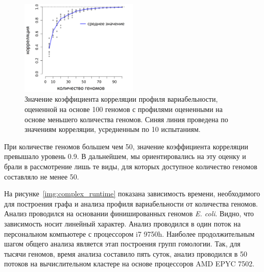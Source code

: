 \begin{figure}[!ht] 
  \center
    \includegraphics[width=0.5\textwidth]{Dissertation/images/complexity/numberOfGenomes.png}
  \caption{Значение коэффициента корреляции профиля вариабельности, оцененной на основе 100 геномов с профилями оцененными на основе меньшего количества геномов. Синяя линия проведена по значениям корреляции, усредненным по 10 испытаниям. }
  \label{img:genome_number} 
\end{figure}

При количестве геномов большем чем 50, значение коэффициента корреляции превышало уровень 0.9. В дальнейшем, мы ориентировались на эту оценку и брали в рассмотрение лишь те виды, для которых доступное количество геномов составляло не менее 50.

На рисунке~\ref{img:complex_runtime} показана зависимость времени, необходимого для построения графа и анализа профиля вариабельности от количества геномов. Анализ проводился на основании финишированных геномов \textit{E. coli}. Видно, что зависимость носит линейный характер. Анализ проводился в один поток на персональном компьютере с процессором i7 9750h. Наиболее продолжительным шагом общего анализа является этап построения групп гомологии. Так, для тысячи геномов, время анализа составило пять суток, анализ проводился в 50 потоков на вычислительном кластере на основе процессоров AMD EPYC 7502.


